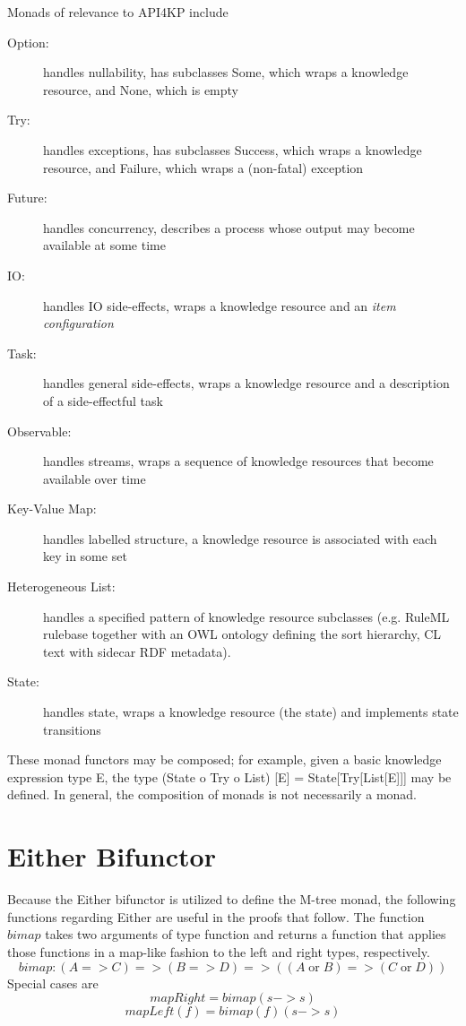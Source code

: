 \documentclass[runningheads]{llncs}
\begin{document}
Monads of relevance to API4KP include
\begin{description}
\item [Option:] handles nullability, has subclasses Some, which wraps a knowledge resource, and None, which is empty
\item [Try:] handles exceptions, has subclasses Success, which wraps a knowledge resource, and Failure, which wraps a (non-fatal) exception
\item [Future:] handles concurrency, describes a process whose output may become available at some time
\item [IO:] handles IO side-effects, wraps a knowledge resource and an \emph{item configuration}
\item [Task:] handles general side-effects, wraps a knowledge resource and a description of a side-effectful task
\item [Observable:] handles streams, wraps a sequence of knowledge resources that become available over time
\item [Key-Value Map:] handles labelled structure, a knowledge resource is associated with each key in some set
\item [Heterogeneous List:] handles a specified pattern of knowledge resource subclasses (e.g. RuleML rulebase together with an OWL ontology defining the sort hierarchy, CL text with sidecar RDF metadata).
\item [State:] handles state, wraps a knowledge resource (the state) and implements state transitions
\end{description}
These monad functors may be composed; for example, given a basic knowledge expression type E, the type (State o Try o List) [E] = State[Try[List[E]]] may be defined.
In general, the composition of monads is not necessarily a monad. 

\section{Either Bifunctor}
Because the Either bifunctor is utilized to define the M-tree monad, the following functions regarding Either are useful in the proofs that follow.
The function $bimap$ takes two arguments of type function and returns a function that applies those functions in a map-like fashion to the left and right types, respectively.
 $$  bimap   : (A=>C) => (B=>D) => ((A \mathop{\mathrm{or}} B)=> (C \mathop{\mathrm{or}} D))$$
 Special cases are
$$  mapRight = bimap( s -> s)$$
$$  mapLeft(f) = bimap(f)(s -> s)$$
 
\end{document}
